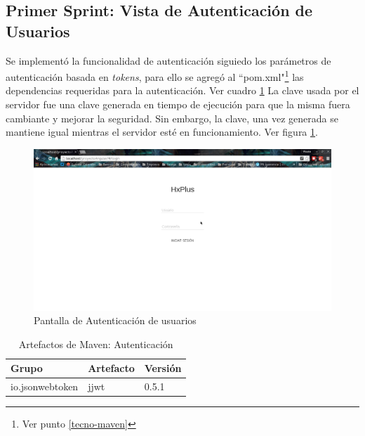     \subsection{Primer Sprint: Vista de Autenticación de Usuarios}
    Se implementó la funcionalidad de autenticación siguiedo los parámetros de autenticación basada en \textit{tokens}, para ello se agregó al ``pom.xml"\footnote{Ver punto \ref{tecno-maven}} las dependencias requeridas para la autenticación. Ver cuadro \ref{artefactos-tba}
    La clave usada por el servidor fue una clave generada en tiempo de ejecución para que la misma fuera cambiante y mejorar la seguridad. Sin embargo, la clave, una vez generada se mantiene igual mientras el servidor esté en funcionamiento. Ver figura \ref{Autenticación}.
    
    \begin{figure}[htbp!]
        \begin{center}
            \includegraphics[width=.9\textwidth]{figures/p1}
        \end{center}
        \caption{Pantalla de Autenticación de usuarios}
        \label{Autenticación}
    \end{figure}
    
    \begin{table}[h!]
        
        \begin{center}
            \begin{tabular}{|l|l|l|}\hline
                Grupo & Artefacto & Versión \\\hline
                io.jsonwebtoken & jjwt & 0.5.1 \\\hline
            \end{tabular}
        \end{center}
        
        \caption{Artefactos de Maven: Autenticación}
        \label{artefactos-tba}
    \end{table}
    
